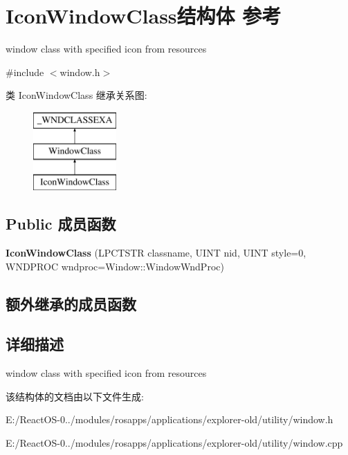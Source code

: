 \hypertarget{struct_icon_window_class}{}\section{Icon\+Window\+Class结构体 参考}
\label{struct_icon_window_class}


window class with specified icon from resources  




{\ttfamily \#include $<$window.\+h$>$}

类 Icon\+Window\+Class 继承关系图\+:\begin{figure}[H]
\begin{center}
\leavevmode
\includegraphics[height=3.000000cm]{struct_icon_window_class}
\end{center}
\end{figure}
\subsection*{Public 成员函数}
\begin{DoxyCompactItemize}
\item 
\mbox{\label{struct_icon_window_class_ae0c694adea58bd543a3fa8fcf0d61a50}} 
{\bfseries Icon\+Window\+Class} (L\+P\+C\+T\+S\+TR classname, U\+I\+NT nid, U\+I\+NT style=0, W\+N\+D\+P\+R\+OC wndproc=Window\+::\+Window\+Wnd\+Proc)
\end{DoxyCompactItemize}
\subsection*{额外继承的成员函数}


\subsection{详细描述}
window class with specified icon from resources 

该结构体的文档由以下文件生成\+:\begin{DoxyCompactItemize}
\item 
E\+:/\+React\+O\+S-\/0../modules/rosapps/applications/explorer-\/old/utility/window.\+h\item 
E\+:/\+React\+O\+S-\/0../modules/rosapps/applications/explorer-\/old/utility/window.\+cpp\end{DoxyCompactItemize}
